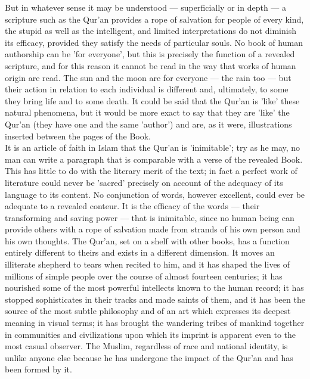 \documentclass[10pt, twoside,openright]{book}
\begin{document}
But in whatever sense it may be understood --- superficially or in depth --- a scripture such as the 
Qur'an provides a rope of salvation for people of every kind, the stupid as well as the intelligent, 
and limited interpretations do not diminish its efficacy, provided they satisfy the needs of 
particular souls. No book of human authorship can be 'for everyone', but this is precisely the 
function of a revealed scripture, and for this reason it cannot be read in the way that works of 
human origin are read. The sun and the moon are for everyone --- the rain too --- but their action in 
relation to each individual is different and, ultimately, to some they bring life and to some death. 
It could be said that the Qur'an is 'like' these natural phenomena, but it would be more exact to say 
that they are 'like' the Qur'an (they have one and the same 'author') and are, as it were, illustrations inserted between the pages of the Book. \\

It is an article of faith in Islam that the Qur'an is 'inimitable'; try as he may, no man can write a 
paragraph that is comparable with a verse of the revealed Book. This has little to do with the 
literary merit of the text; in fact a perfect work of literature could never be 'sacred' precisely on 
account of the adequacy of its language to its content. No conjunction of words, however excellent, 
could ever be adequate to a revealed conteur. It is the efficacy of the words --- their transforming 
and saving power --- that is inimitable, since no human being can provide others with a rope of 
salvation made from strands of his own person and his own thoughts. The Qur'an, set on a shelf with 
other books, has a function entirely different to theirs and exists in a different dimension. It 
moves an illiterate shepherd to tears when recited to him, and it has shaped the lives of millions of 
simple people over the course of almost fourteen centuries; it has nourished some of the most 
powerful intellects known to the human record; it has stopped sophisticates in their tracks and made 
saints of them, and it has been the source of the most subtle philosophy and of an art which 
expresses its deepest meaning in visual terms; it has brought the wandering tribes of mankind 
together in communities and civilizations upon which its imprint is apparent even to the most casual 
observer. The Muslim, regardless of race and national identity, is unlike anyone else because he has 
undergone the impact of the Qur'an and has been formed by it. \\
\end{document}
